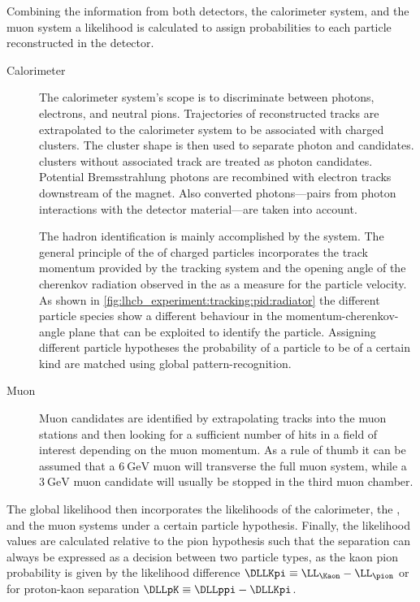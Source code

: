 Combining the information from both \RICH detectors, the calorimeter system, and
the muon system a likelihood is calculated to assign \PID probabilities to each
particle reconstructed in the detector.
%
\begin{description}
  \item[Calorimeter \PID] The calorimeter system's scope is to discriminate
  between photons, electrons, and neutral pions. Trajectories of reconstructed
  tracks are extrapolated to the calorimeter system to be associated with
  charged clusters. The cluster shape is then used to separate photon and \piz
  candidates. \ECAL clusters without associated track are treated as photon
  candidates. Potential Bremsstrahlung photons are recombined with electron
  tracks downstream of the magnet. Also converted photons---\elel pairs from
  photon interactions with the detector material---are taken into account.
  \item[\RICH \PID] The hadron identification is mainly accomplished by the
  \RICH system. The general principle of the \RICH \PID of charged particles
  incorporates the track momentum provided by the tracking system and the
  opening angle of the cherenkov radiation observed in the \RICH as a measure
  for the particle velocity. As shown in
  \cref{fig:lhcb_experiment:tracking:pid:radiator} the different particle
  species show a different behaviour in the momentum-cherenkov-angle plane that
  can be exploited to identify the particle. Assigning different particle
  hypotheses the probability of a particle to be of a certain kind are matched
  using global pattern-recognition.
  \item[Muon \PID] Muon candidates are identified by extrapolating tracks into
  the muon stations and then looking for a sufficient number of hits in a field
  of interest depending on the muon momentum. As a rule of thumb it can be
  assumed that a $\SI{6}{\GeV}$ muon will transverse the full muon system, while
  a $\SI{3}{\GeV}$ muon candidate will usually be stopped in the third muon
  chamber.
\end{description}
%
The global \PID likelihood then incorporates the likelihoods of the calorimeter,
the \RICH, and the muon systems under a certain particle hypothesis. Finally,
the likelihood values are calculated relative to the pion hypothesis such that
the separation can always be expressed as a decision between two particle types, as
\eg the kaon \vs pion probability is given by the likelihood difference $\DLLKpi
\equiv \LL_{\Kaon} - \LL_{\pion}$ or for proton-kaon separation $\DLLpK \equiv
\DLLppi - \DLLKpi$.

